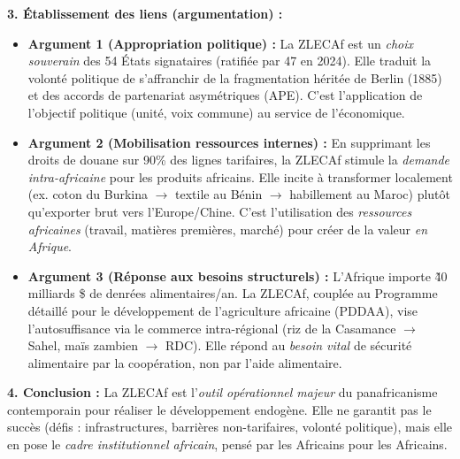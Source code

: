 \documentclass[11pt]{article}
\begin{document}
\begin{exoresolu}
\textbf{3. Établissement des liens (argumentation) :}
\begin{itemize}
    \item \textbf{Argument 1 (Appropriation politique) :} La ZLECAf est un \emph{choix souverain} des 54 États signataires (ratifiée par 47 en 2024). Elle traduit la volonté politique de s'affranchir de la fragmentation héritée de Berlin (1885) et des accords de partenariat asymétriques (APE). C'est l'application de l'objectif politique (unité, voix commune) au service de l'économique.
    \item \textbf{Argument 2 (Mobilisation ressources internes) :} En supprimant les droits de douane sur 90\% des lignes tarifaires, la ZLECAf stimule la \emph{demande intra-africaine} pour les produits africains. Elle incite à transformer localement (ex. coton du Burkina $\to$ textile au Bénin $\to$ habillement au Maroc) plutôt qu'exporter brut vers l'Europe/Chine. C'est l'utilisation des \emph{ressources africaines} (travail, matières premières, marché) pour créer de la valeur \emph{en Afrique}.
    \item \textbf{Argument 3 (Réponse aux besoins structurels) :} L'Afrique importe \~40 milliards \$ de denrées alimentaires/an. La ZLECAf, couplée au Programme détaillé pour le développement de l'agriculture africaine (PDDAA), vise l'autosuffisance via le commerce intra-régional (riz de la Casamance $\to$ Sahel, maïs zambien $\to$ RDC). Elle répond au \emph{besoin vital} de sécurité alimentaire par la coopération, non par l'aide alimentaire.
\end{itemize}

\textbf{4. Conclusion :}
La ZLECAf est l'\emph{outil opérationnel majeur} du panafricanisme contemporain pour réaliser le développement endogène. Elle ne garantit pas le succès (défis : infrastructures, barrières non-tarifaires, volonté politique), mais elle en pose le \emph{cadre institutionnel africain}, pensé par les Africains pour les Africains.
\end{exoresolu}
\end{document}

